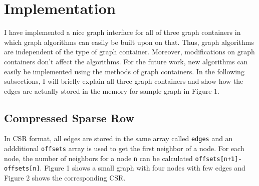 \documentclass{article}
\begin{document}
\section{Implementation}
 I have implemented a nice graph interface for all of three graph containers in which graph algorithms can easily be built upon on that. Thus, graph algorithms are independent of the type of graph container. Moreover, modifications on graph containers don't affect the algorithms. For the future work, new algorithms can easily be implemented using the methods of graph containers. In the following subsections, I will briefly explain all three graph containers and show how the edges are actually stored in the memory for sample graph in Figure 1.
\begin{center} 
 
\end{center}

\subsection{Compressed Sparse Row}
In CSR format, all edges are stored in the same array called \texttt{edges} and an addditional \texttt{offsets} array is used to get the first neighbor of a node. For each node, the number of neighbors for a node \texttt{n} can be calculated \texttt{offsets[n+1]-offsets[n]}. Figure 1 shows a small graph with four nodes with few edges and Figure 2 shows the corresponding CSR.\\

\end{document}

